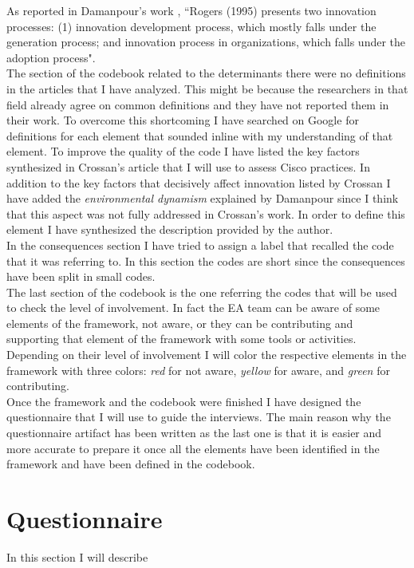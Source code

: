 As reported in Damanpour's work \citep{damanpour2006}, ``Rogers (1995) presents two innovation processes: (1) innovation development process, which mostly falls under the generation process; and innovation process in organizations, which falls under the adoption process".
\\ %
The section of the codebook related to the determinants there were no definitions in the articles that I have analyzed. This might be because the researchers in that field already agree on common definitions and they have not reported them in their work.
To overcome this shortcoming I have searched on Google for definitions for each element that sounded inline with my understanding of that element. To improve the quality of the code I have listed the key factors synthesized in Crossan's article \citep{crossan2010} that I will use to assess Cisco practices.
In addition to the key factors that decisively affect innovation listed by Crossan I have added the \textit{environmental dynamism} explained by Damanpour \citep{damanpour1998} since I think that this aspect was not fully addressed in Crossan's work. In order to define this element I have synthesized the description provided by the author.
\\ %
In the consequences section I have tried to assign a label that recalled the code that it was referring to. In this section the codes are short since the consequences have been split in small codes.
\\ %
The last section of the codebook is the one referring the codes that will be used to check the level of involvement. In fact the EA team can be aware of some elements of the framework, not aware, or they can be contributing and supporting that element of the framework with some tools or activities. Depending on their level of involvement I will color the respective elements in the framework with three colors: \textit{red} for not aware, \textit{yellow} for aware, and \textit{green} for contributing.
\\
Once the framework and the codebook were finished I have designed the questionnaire that I will use to guide the interviews. The main reason why the questionnaire artifact has been written as the last one is that it is easier and more accurate to prepare it once all the elements have been identified in the framework and have been defined in the codebook.

\section{Questionnaire}
In this section I will describe 


